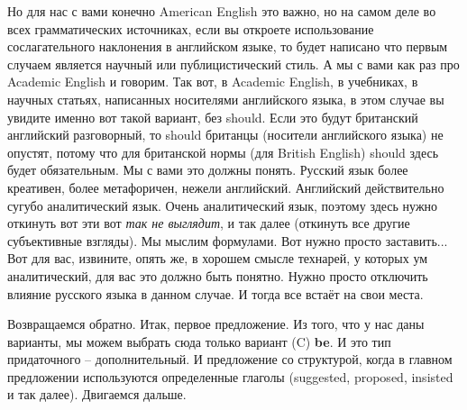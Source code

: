 \documentclass[main.tex]{subfiles}
\begin{document}
Но для нас с вами конечно American English это важно, но на самом деле во всех грамматических источниках, если вы откроете использование сослагательного наклонения в английском языке, то будет написано что первым случаем является научный или публицистический стиль.
А мы с вами как раз про Academic English и говорим.
Так вот, в Academic English, в учебниках, в научных статьях, написанных носителями английского языка, в этом случае вы увидите именно вот такой вариант, без should.
Если это будут британский английский разговорный, то should британцы (носители английского языка) не опустят, потому что для британской нормы (для British English) should здесь будет обязательным.
Мы с вами это должны понять.
Русский язык более креативен, более метафоричен, нежели английский.
Английский действительно сугубо аналитический язык.
Очень аналитический язык, поэтому здесь нужно откинуть вот эти вот \textit{так не выглядит}, и так далее (откинуть все другие субъективные взгляды).
Мы мыслим формулами.
Вот нужно просто заставить...
Вот для вас, извините, опять же, в хорошем смысле технарей, у которых ум аналитический, для вас это должно быть понятно.
Нужно просто отключить влияние русского языка в данном случае.
И тогда все встаёт на свои места.

Возвращаемся обратно.
Итак, первое предложение.
Из того, что у нас даны варианты, мы можем выбрать сюда только вариант (C) \textbf{be}.
И это тип придаточного -- дополнительный.
И предложение со структурой, когда в главном предложении используются определенные глаголы (suggested, proposed, insisted и так далее).
Двигаемся дальше.
\end{document}
